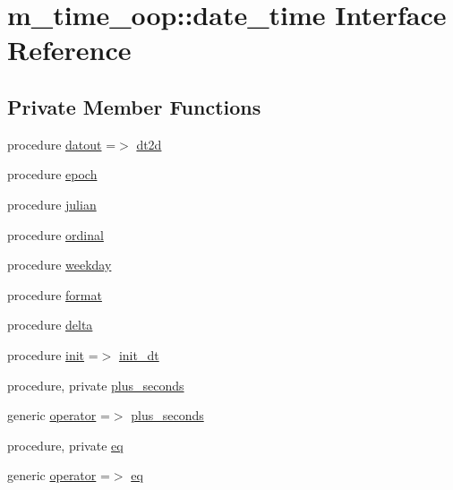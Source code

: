 \hypertarget{structm__time__oop_1_1date__time}{}\section{m\+\_\+time\+\_\+oop\+:\+:date\+\_\+time Interface Reference}
\label{structm__time__oop_1_1date__time}
\subsection*{Private Member Functions}
\begin{DoxyCompactItemize}
\item 
procedure \hyperlink{structm__time__oop_1_1date__time_a1bb75eb969440ef0faf1f46e46de1868}{datout} =$>$ \hyperlink{namespacem__time__oop_ac68405e5566d5aec59cd1fba7145130c}{dt2d}
\item 
procedure \hyperlink{structm__time__oop_1_1date__time_a12b64ba32e07d2fa6204a62ecf6a2efb}{epoch}
\item 
procedure \hyperlink{structm__time__oop_1_1date__time_a67f3d441a50fcc5e6e55d472d66dab78}{julian}
\item 
procedure \hyperlink{structm__time__oop_1_1date__time_aa096a6bd2457e5a9370f89e5e067dc27}{ordinal}
\item 
procedure \hyperlink{structm__time__oop_1_1date__time_a921079cbc082ff2705cebdf330df3270}{weekday}
\item 
procedure \hyperlink{structm__time__oop_1_1date__time_a72439bf18aad8469effe0271bc9c64c9}{format}
\item 
procedure \hyperlink{structm__time__oop_1_1date__time_abb4e1f51226cf6adc9c1b4de56144b99}{delta}
\item 
procedure \hyperlink{structm__time__oop_1_1date__time_ad53d814cb29600d3bf038415dad3d316}{init} =$>$ \hyperlink{namespacem__time__oop_ac81ff1eb27f637a60530d3c5d442fc71}{init\+\_\+dt}
\item 
procedure, private \hyperlink{structm__time__oop_1_1date__time_a86c3ebbfa03eaab62d536e6d01ad67dd}{plus\+\_\+seconds}
\item 
generic \hyperlink{structm__time__oop_1_1date__time_adee559f2f476e1167eb7846a582154ae}{operator} =$>$ \hyperlink{structm__time__oop_1_1date__time_a86c3ebbfa03eaab62d536e6d01ad67dd}{plus\+\_\+seconds}
\item 
procedure, private \hyperlink{structm__time__oop_1_1date__time_a1215616f84b038aca246197e9ad28a48}{eq}
\item 
generic \hyperlink{structm__time__oop_1_1date__time_a33e80b5e54eec6e02c3a9dc0bc30e31a}{operator} =$>$ \hyperlink{structm__time__oop_1_1date__time_a1215616f84b038aca246197e9ad28a48}{eq}

\end{DoxyCompactItemize}
